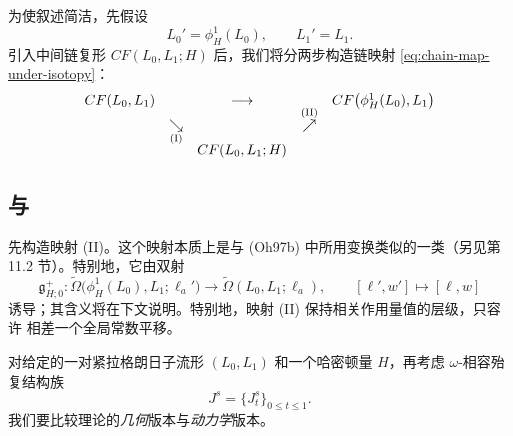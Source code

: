为使叙述简洁，先假设
\[
  L_0'=\phi_H^1(L_0),
  \qquad
  L_1'=L_1.
\]
引入中间链复形 $CF(L_0,L_1;H)$ 后，我们将分两步构造链映射
\eqref{eq:chain-map-under-isotopy}：
\begin{equation}
  \begin{array}{ccccc}
    CF(L_0,L_1)
      &&\longrightarrow&&
    CF\bigl(\phi_H^1(L_0),L_1\bigr)
    \\[-2pt]
    &\underset{\text{\rm (I)}}{\searrow}
      &&\overset{\text{\rm (II)}}{\nearrow}&
    \\[-2pt]
    &&CF(L_0,L_1;H)&&
  \end{array}
\label{eq:two-stage-chain-map}
\end{equation}

\subsection{\termGeometricVersion{}与\termDynamicalVersion{}}
\label{subsec:geometric-versus-dynamical}

先构造映射 (II)。这个映射本质上是与 (Oh97b) 中所用变换类似的一类\emph{\termCoordinateChange{}}（另见第 11.2 节）。特别地，它由双射
\[
  \mathfrak g_{H;0}^+:
  \widetilde\Omega\bigl(\phi_H^1(L_0),L_1;\ell_a'\bigr)
  \longrightarrow
  \widetilde\Omega(L_0,L_1;\ell_a),
  \qquad
  [\ell',w']\longmapsto[\ell,w]
\]
诱导；其含义将在下文说明。特别地，映射 (II) 保持相关作用量值的层级，只容许
相差一个全局常数平移。

对给定的一对紧拉格朗日子流形 $(L_0,L_1)$ 和一个哈密顿量 $H$，再考虑
$\omega$-相容殆复结构族
\[
  J^s=\{J_t^s\}_{0\leq t\leq1}.
\]
我们要比较\personFloer{}理论的\emph{几何}版本与\emph{动力学}版本。

